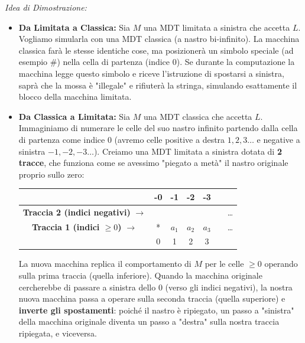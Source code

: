 \textit{Idea di Dimostrazione:}
\begin{itemize}
    \item[$\impliedby$)] \textbf{Da Limitata a Classica:} Sia $M$ una MDT limitata a sinistra che accetta $L$. Vogliamo simularla con una MDT classica (a nastro bi-infinito). La macchina classica farà le stesse identiche cose, ma posizionerà un simbolo speciale (ad esempio $\#$) nella cella di partenza (indice 0). Se durante la computazione la macchina legge questo simbolo e riceve l'istruzione di spostarsi a sinistra, saprà che la mossa è "illegale" e rifiuterà la stringa, simulando esattamente il blocco della macchina limitata.

    \item[$\implies$)] \textbf{Da Classica a Limitata:} Sia $M$ una MDT classica che accetta $L$. Immaginiamo di numerare le celle del suo nastro infinito partendo dalla cella di partenza come indice $0$ (avremo celle positive a destra $1, 2, 3 \dots$ e negative a sinistra $-1, -2, -3 \dots$). 
    Creiamo una MDT limitata a sinistra dotata di \textbf{2 tracce}, che funziona come se avessimo "piegato a metà" il nastro originale proprio sullo zero:
    
    \begin{center}
    \begin{tabular}{c|c|c|c|c|c|c}
    \multicolumn{1}{c}{} & \multicolumn{1}{c}{\scriptsize -0} & \multicolumn{1}{c}{\scriptsize -1} & \multicolumn{1}{c}{\scriptsize -2} & \multicolumn{1}{c}{\scriptsize -3} & \multicolumn{1}{c}{} & \multicolumn{1}{c}{} \\
    \hline
    \textbf{Traccia 2 (indici negativi)} $\rightarrow$ & & & & & & \dots \\
    \hline
    \textbf{Traccia 1 (indici $\ge 0$)} $\rightarrow$ & * & $a_1$ & $a_2$ & $a_3$ & & \dots \\
    \hline
    \multicolumn{1}{c}{} & \multicolumn{1}{c}{\scriptsize 0} & \multicolumn{1}{c}{\scriptsize 1} & \multicolumn{1}{c}{\scriptsize 2} & \multicolumn{1}{c}{\scriptsize 3} & \multicolumn{1}{c}{} & \multicolumn{1}{c}{} \\
    \end{tabular}
    \end{center}
    
    La nuova macchina replica il comportamento di $M$ per le celle $\ge 0$ operando sulla prima traccia (quella inferiore). Quando la macchina originale cercherebbe di passare a sinistra dello $0$ (verso gli indici negativi), la nostra nuova macchina passa a operare sulla seconda traccia (quella superiore) e \textbf{inverte gli spostamenti}: poiché il nastro è ripiegato, un passo a "sinistra" della macchina originale diventa un passo a "destra" sulla nostra traccia ripiegata, e viceversa.
\end{itemize}


